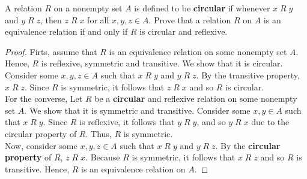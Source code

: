 \documentclass[12pt]{article}
\newenvironment{problem}[2][Problem]{\begin{trivlist}
		\item[\hskip \labelsep {\bfseries #1}\hskip \labelsep {\bfseries #2.}]}{\end{trivlist}}
\begin{document}
	\begin{problem}{31}
		A relation $R$ on a nonempty set $A$ is defined to be \textbf{circular} if whenever $x \; R \; y$ and $y\; R \; z$, then $z\; R \; x$ for all $x,y,z \in A$. Prove that a relation $R$ on $A$ is an equivalence relation if and only if $R$ is circular and reflexive.
		\begin{proof}
			Firts, assume that $R$ is an equivalence relation on some nonempty set $A$. Hence, $R$ is reflexive, symmetric and transitive. We show that it is circular. Consider some $x,y,z\in A$ such that $x\; R \; y$ and $y\; R \; z$. By the transitive property, $x\; R \; z$. Since $R$ is symmetric, it follows that $z\; R \;x$ and so $R$ is circular.\\
			 
			For the converse, Let $R$ be a \textbf{circular} and reflexive relation on some nonempty set $A$. We show that it is symmetric and transitive. Consider some $x,y \in A$ such that $x \; R \; y$. Since $R$ is reflexive, it follows that $y \; R \; y$, and so $y\; R \; x$ due to the circular property of $R$. Thus, $R$ is symmetric.\\
			Now, consider some $x,y,z\in A$ such that $x\; R \;y$ and $y\; R \;z$. By the \textbf{circular property} of $R$, $z \; R \;x$. Because $R$ is symmetric, it follows that $x\; R \; z$ and so $R$ is transitive. Hence, $R$ is an equivalence relation on $A$.
		\end{proof}
	\end{problem}
\end{document}

